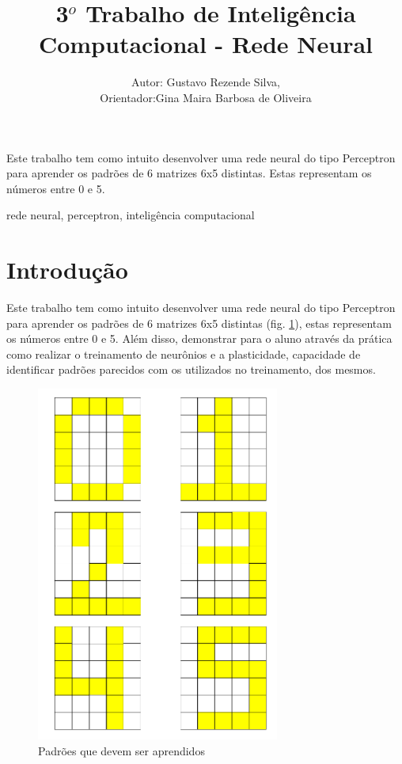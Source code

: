 \documentclass[11pt]{article}
\title{3$^o$ Trabalho de Inteligência Computacional - Rede Neural}
\author{Autor: Gustavo Rezende Silva,\\ Orientador:Gina Maira Barbosa
de Oliveira}
\begin{document}
\maketitle


\begin{resumo}
Este trabalho tem como intuito desenvolver uma rede neural do tipo Perceptron
para aprender os padrões de 6 matrizes 6x5 distintas. Estas representam os números
entre 0 e 5.
\end{resumo}

\begin{palavraschave}
rede neural, perceptron, inteligência computacional
\end{palavraschave}

\section{Introdução}
\label{sec:intro}

Este trabalho tem como intuito desenvolver uma rede neural do tipo Perceptron
para aprender os padrões de 6 matrizes 6x5 distintas (fig. \ref{fig:patterns}),
estas representam os números entre 0 e 5. Além disso, demonstrar para o aluno
através da prática como realizar o treinamento de neurônios e a plasticidade,
capacidade de identificar padrões parecidos com os utilizados no treinamento, dos
mesmos.

\begin{figure}[h]
  \centering
  \includegraphics[width=8cm]{patterns.png}
  \caption{Padrões que devem ser aprendidos}
  \label{fig:patterns}
\end{figure}
\end{document}
